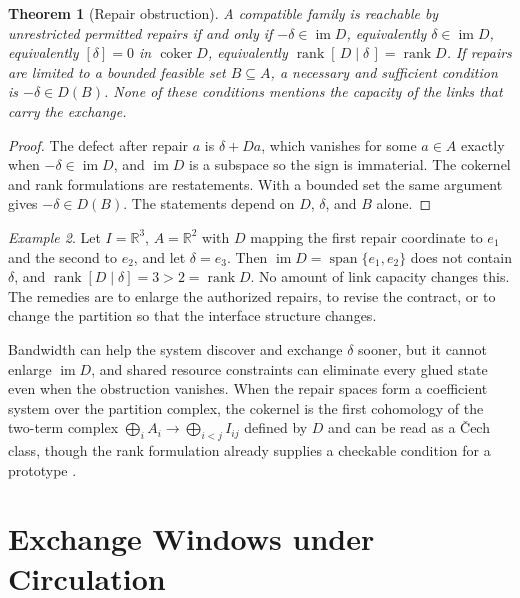 \documentclass[11pt,openany]{book}
\theoremstyle{plain}
\newtheorem{theorem}{Theorem}[chapter]
\theoremstyle{definition}
\theoremstyle{remark}
\newtheorem{example}[theorem]{Example}
\newcommand{\R}{\mathbb{R}}
\begin{document}
\begin{theorem}[Repair obstruction]
\label{thm:repair}
A compatible family is reachable by unrestricted permitted repairs if and only if $-\delta\in\operatorname{im}D$, equivalently $\delta\in\operatorname{im}D$, equivalently $[\delta]=0$ in $\operatorname{coker}D$, equivalently $\operatorname{rank}[\,D\mid\delta\,]=\operatorname{rank}D$. If repairs are limited to a bounded feasible set $B\subseteq A$, a necessary and sufficient condition is $-\delta\in D(B)$. None of these conditions mentions the capacity of the links that carry the exchange.
\end{theorem}
\begin{proof}
The defect after repair $a$ is $\delta+Da$, which vanishes for some $a\in A$ exactly when $-\delta\in\operatorname{im}D$, and $\operatorname{im}D$ is a subspace so the sign is immaterial. The cokernel and rank formulations are restatements. With a bounded set the same argument gives $-\delta\in D(B)$. The statements depend on $D$, $\delta$, and $B$ alone.
\end{proof}

\begin{example}
Let $I=\R^3$, $A=\R^2$ with $D$ mapping the first repair coordinate to $e_1$ and the second to $e_2$, and let $\delta=e_3$. Then $\operatorname{im}D=\operatorname{span}\{e_1,e_2\}$ does not contain $\delta$, and $\operatorname{rank}[D\mid\delta]=3>2=\operatorname{rank}D$. No amount of link capacity changes this. The remedies are to enlarge the authorized repairs, to revise the contract, or to change the partition so that the interface structure changes.
\end{example}

Bandwidth can help the system discover and exchange $\delta$ sooner, but it cannot enlarge $\operatorname{im}D$, and shared resource constraints can eliminate every glued state even when the obstruction vanishes. When the repair spaces form a coefficient system over the partition complex, the cokernel is the first cohomology of the two-term complex $\bigoplus_iA_i\to\bigoplus_{i<j}I_{ij}$ defined by $D$ and can be read as a \v{C}ech class, though the rank formulation already supplies a checkable condition for a prototype \cite{flyxion-gpu}.

\chapter{Exchange Windows under Circulation}
\label{ch:exchange}
\end{document}
